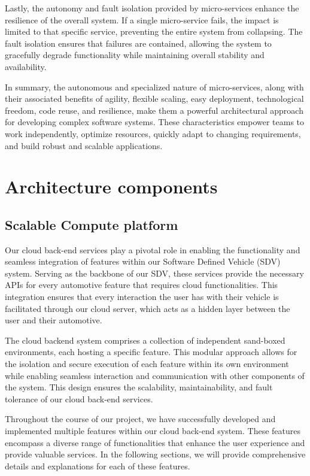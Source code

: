 \documentclass[
12pt,
oneside, 
onehalfspacing, 
nolistspacing, 
parskip, 
chapterinoneline, 
]{AASTCOMPUTER}
\begin{document}
Lastly, the autonomy and fault isolation provided by micro-services enhance the resilience of the overall system. If a single micro-service fails, the impact is limited to that specific service, preventing the entire system from collapsing. The fault isolation ensures that failures are contained, allowing the system to gracefully degrade functionality while maintaining overall stability and availability.

In summary, the autonomous and specialized nature of micro-services, along with their associated benefits of agility, flexible scaling, easy deployment, technological freedom, code reuse, and resilience, make them a powerful architectural approach for developing complex software systems. These characteristics empower teams to work independently, optimize resources, quickly adapt to changing requirements, and build robust and scalable applications.
\section{Architecture components}
\subsection{Scalable Compute platform}
Our cloud back-end services play a pivotal role in enabling the functionality and seamless integration of features within our Software Defined Vehicle (SDV) system. Serving as the backbone of our SDV, these services provide the necessary APIs for every automotive feature that requires cloud functionalities. This integration ensures that every interaction the user has with their vehicle is facilitated through our cloud server, which acts as a hidden layer between the user and their automotive.

The cloud backend system comprises a collection of independent sand-boxed environments, each hosting a specific feature. This modular approach allows for the isolation and secure execution of each feature within its own environment while enabling seamless interaction and communication with other components of the system. This design ensures the scalability, maintainability, and fault tolerance of our cloud back-end services.

Throughout the course of our project, we have successfully developed and implemented multiple features within our cloud back-end system. These features encompass a diverse range of functionalities that enhance the user experience and provide valuable services. In the following sections, we will provide comprehensive details and explanations for each of these features.
\end{document}
